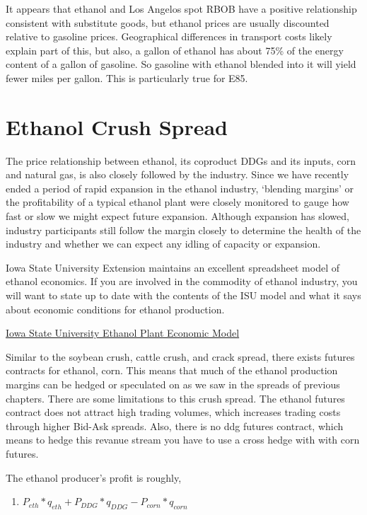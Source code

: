 \documentclass[
  letterpaper,
  DIV=11,
  numbers=noendperiod]{scrreprt}
\providecommand{\tightlist}{%
  \setlength{\itemsep}{0pt}\setlength{\parskip}{0pt}}\usepackage{longtable,booktabs,array}
\begin{document}
It appears that ethanol and Los Angelos spot RBOB have a positive
relationship consistent with substitute goods, but ethanol prices are
usually discounted relative to gasoline prices. Geographical differences
in transport costs likely explain part of this, but also, a gallon of
ethanol has about 75\% of the energy content of a gallon of gasoline. So
gasoline with ethanol blended into it will yield fewer miles per gallon.
This is particularly true for E85.

\hypertarget{ethanol-crush-spread}{%
\section{Ethanol Crush Spread}\label{ethanol-crush-spread}}

The price relationship between ethanol, its coproduct DDGs and its
inputs, corn and natural gas, is also closely followed by the industry.
Since we have recently ended a period of rapid expansion in the ethanol
industry, `blending margins' or the profitability of a typical ethanol
plant were closely monitored to gauge how fast or slow we might expect
future expansion. Although expansion has slowed, industry participants
still follow the margin closely to determine the health of the industry
and whether we can expect any idling of capacity or expansion.

Iowa State University Extension maintains an excellent spreadsheet model
of ethanol economics. If you are involved in the commodity of ethanol
industry, you will want to state up to date with the contents of the ISU
model and what it says about economic conditions for ethanol production.

\href{https://www.extension.iastate.edu/agdm/articles/hof/HofJan08.html}{Iowa
State University Ethanol Plant Economic Model}

Similar to the soybean crush, cattle crush, and crack spread, there
exists futures contracts for ethanol, corn. This means that much of the
ethanol production margins can be hedged or speculated on as we saw in
the spreads of previous chapters. There are some limitations to this
crush spread. The ethanol futures contract does not attract high trading
volumes, which increases trading costs through higher Bid-Ask spreads.
Also, there is no ddg futures contract, which means to hedge this
revanue stream you have to use a cross hedge with with corn futures.

The ethanol producer's profit is roughly,

\begin{enumerate}
\def\labelenumi{\arabic{enumi}.}
\tightlist
\item
  \(P_{eth}*q_{eth} + P_{DDG}*q_{DDG} - P_{corn}*q_{corn}\)
\end{enumerate}
\end{document}
